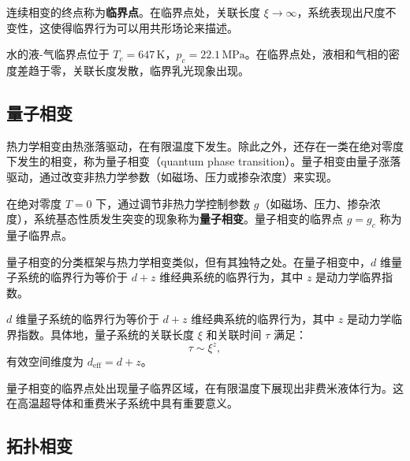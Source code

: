 \begin{definition}[临界点]
连续相变的终点称为\textbf{临界点}。在临界点处，关联长度 $\xi \to \infty$，系统表现出尺度不变性，这使得临界行为可以用共形场论来描述。
\end{definition}

\begin{example}
水的液-气临界点位于 $T_c = 647\,\mathrm{K}$，$p_c = 22.1\,\mathrm{MPa}$。在临界点处，液相和气相的密度差趋于零，关联长度发散，临界乳光现象出现。
\end{example}

\subsection{量子相变}

\begin{remark}
热力学相变由热涨落驱动，在有限温度下发生。除此之外，还存在一类在绝对零度下发生的相变，称为量子相变（quantum phase transition）。量子相变由量子涨落驱动，通过改变非热力学参数（如磁场、压力或掺杂浓度）来实现。
\end{remark}

\begin{definition}[量子相变]
在绝对零度 $T = 0$ 下，通过调节非热力学控制参数 $g$（如磁场、压力、掺杂浓度），系统基态性质发生突变的现象称为\textbf{量子相变}。量子相变的临界点 $g = g_c$ 称为量子临界点。
\end{definition}

量子相变的分类框架与热力学相变类似，但有其独特之处。在量子相变中，$d$ 维量子系统的临界行为等价于 $d+z$ 维经典系统的临界行为，其中 $z$ 是动力学临界指数。

\begin{theorem}[量子-经典映射]
$d$ 维量子系统的临界行为等价于 $d+z$ 维经典系统的临界行为，其中 $z$ 是动力学临界指数。具体地，量子系统的关联长度 $\xi$ 和关联时间 $\tau$ 满足：
\begin{equation}
    \tau \sim \xi^z,
\end{equation}
有效空间维度为 $d_{\text{eff}} = d + z$。
\end{theorem}

\begin{remark}
量子相变的临界点处出现量子临界区域，在有限温度下展现出非费米液体行为。这在高温超导体和重费米子系统中具有重要意义。
\end{remark}

\subsection{拓扑相变}

